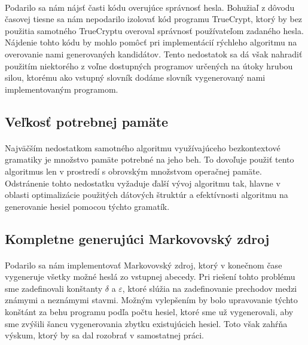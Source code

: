 \paragraph{}
Podarilo sa nám nájsť časti kódu overujúce správnosť hesla. Bohužiaľ z dôvodu časovej tiesne sa nám nepodarilo izolovať kód programu TrueCrypt, ktorý by bez použitia samotného TrueCryptu overoval správnosť používateľom zadaného hesla. Nájdenie tohto kódu by mohlo pomôcť pri implementácií rýchleho algoritmu na overovanie nami generovaných kandidátov. Tento nedostatok sa dá však nahradiť použitím niektorého z voľne dostupných programov určených na útoky hrubou silou, ktorému ako vstupný slovník dodáme slovník vygenerovaný nami implementovaným programom.

\subsection{Veľkosť potrebnej pamäte}
\paragraph{}
Najväčším nedostatkom samotného algoritmu využívajúceho bezkontextové gramatiky je množstvo pamäte potrebné na jeho beh. To dovoľuje použiť tento algoritmus len v prostredí s obrovským množstvom operačnej pamäte. Odstránenie tohto nedostatku vyžaduje ďalší vývoj algoritmu tak, hlavne v oblasti optimalizácie použitých dátových štruktúr a efektívnosti algoritmu na generovanie hesiel pomocou týchto gramatík.

\subsection{Kompletne generujúci Markovovský zdroj}
\paragraph{}
Podarilo sa nám implementovať Markovovský zdroj, ktorý v konečnom čase vygeneruje všetky možné heslá zo vstupnej abecedy. Pri riešení tohto problému sme zadefinovali konštanty \(\delta\) a \(\varepsilon\), ktoré slúžia na zadefinovanie prechodov medzi známymi a neznámymi stavmi. Možným vylepšením by bolo upravovanie týchto konštánt za behu programu podľa počtu hesiel, ktoré sme už vygenerovali, aby sme zvýšili šancu vygenerovania zbytku existujúcich hesiel. Toto však zahŕňa výskum, ktorý by sa dal rozobrať v samostatnej práci.
